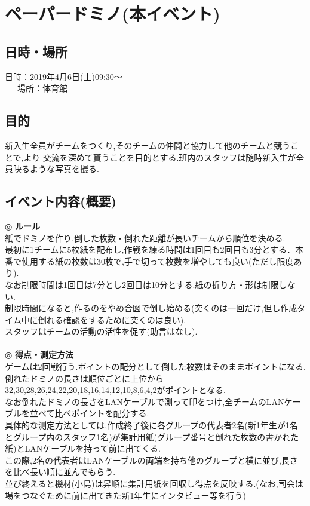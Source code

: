 \documentclass[a4j]{jarticle}
\begin{document}
\section{ペーパードミノ(本イベント)}
\subsection{日時・場所}
日時：2019年4月6日(土)09:30〜\\
\ \ \ 場所：体育館\\
\subsection{目的}
新入生全員がチームをつくり,そのチームの仲間と協力して他のチームと競うことで,より
交流を深めて貰うことを目的とする.班内のスタッフは随時新入生が全員映るような写真を撮る. \vspace{-3mm} \\

\subsection{イベント内容(概要)}

◎ \textbf{ルール} \\
紙でドミノを作り,倒した枚数・倒れた距離が長いチームから順位を決める.\\
最初に1チームに5枚紙を配布し,作戦を練る時間は1回目も2回目も3分とする．本番で使用する紙の枚数は30枚で,手で切って枚数を増やしても良い(ただし限度あり). \\
なお制限時間は1回目は7分とし2回目は10分とする.紙の折り方・形は制限しない. \\
制限時間になると,作るのをやめ合図で倒し始める(突くのは一回だけ,但し作成タイム中に倒れる確認をするために突くのは良い). \\
スタッフはチームの活動の活性を促す(助言はなし).\\\\

◎ \textbf{得点・測定方法} \\
ゲームは2回戦行う.ポイントの配分として倒した枚数はそのままポイントになる.\\
倒れたドミノの長さは順位ごとに上位から32,30,28,26,24,22,20,18,16,14,12,10,8,6,4,2がポイントとなる.\\
なお倒れたドミノの長さをLANケーブルで測って印をつけ,全チームのLANケーブルを並べて比べポイントを配分する.\\
具体的な測定方法としては,作成終了後に各グループの代表者2名(新1年生が1名とグループ内のスタッフ1名)が集計用紙(グループ番号と倒れた枚数の書かれた紙)とLANケーブルを持って前に出てくる.\\
この際,2名の代表者はLANケーブルの両端を持ち他のグループと横に並び,長さを比べ長い順に並んでもらう.\\
並び終えると機材(小島)は昇順に集計用紙を回収し得点を反映する.(なお,司会は場をつなぐために前に出てきた新1年生にインタビュー等を行う) \\
\end{document}
